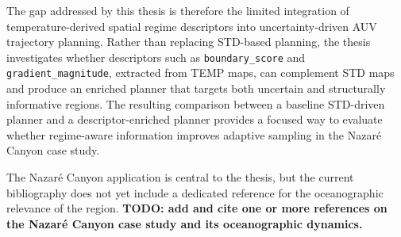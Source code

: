 The gap addressed by this thesis is therefore the limited integration of temperature-derived spatial regime descriptors into uncertainty-driven AUV trajectory planning. Rather than replacing STD-based planning, the thesis investigates whether descriptors such as \texttt{boundary\_score} and \texttt{gradient\_magnitude}, extracted from TEMP maps, can complement STD maps and produce an enriched planner that targets both uncertain and structurally informative regions. The resulting comparison between a baseline STD-driven planner and a descriptor-enriched planner provides a focused way to evaluate whether regime-aware information improves adaptive sampling in the Nazaré Canyon case study.

The Nazaré Canyon application is central to the thesis, but the current bibliography does not yet include a dedicated reference for the oceanographic relevance of the region. \textbf{TODO: add and cite one or more references on the Nazaré Canyon case study and its oceanographic dynamics.}
